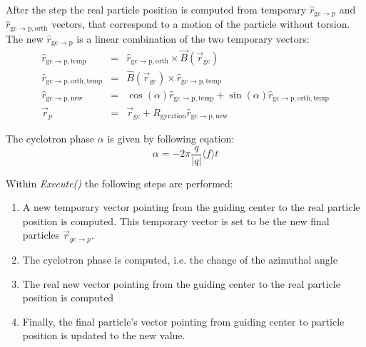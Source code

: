     After the step the real particle position is computed from temporary $\hat{r}_{\mathrm{gc\rightarrow p}}$ and $\hat{r}_{\mathrm{gc\rightarrow p, orth}}$ vectors, that correspond to a motion of the particle without torsion. The new $\hat{r}_{\mathrm{gc\rightarrow p}}$ is a linear combination of the two temporary vectors: 
    \begin{eqnarray}
        \hat{r}_{\mathrm{gc\rightarrow p, temp}} &=& \hat{r}_{\mathrm{gc\rightarrow p, orth}} \times \vec{B}(\vec{r}_{\mathrm{gc}}) \\
        \hat{r}_{\mathrm{gc\rightarrow p, orth, temp}}  &=& \hat{B}(\vec{r}_{\mathrm{gc}}) \times \hat{r}_{\mathrm{gc\rightarrow p, temp}} \\
        \hat{r}_{\mathrm{gc\rightarrow p, new}}  &=& \cos(\alpha) \hat{r}_{\mathrm{gc\rightarrow p, temp}} + \sin(\alpha) \hat{r}_{\mathrm{gc\rightarrow p,orth, temp}} \\
        \vec{r}_{p} &=& \vec{r}_{\mathrm{gc}} + R_{\mathrm{gyration}} \hat{r}_{\mathrm{gc\rightarrow p, new}}
    \end{eqnarray}
    
    The cyclotron phase $\alpha$ is given by following eqation:
    \begin{equation}
        \alpha = - 2 \pi \frac{q}{|q|} \langle f \rangle t
    \end{equation}
    
    Within \textit{Execute()} the following steps are performed:
    \begin{enumerate}
        \item A new temporary vector pointing from the guiding center to the real particle position is computed. This temporary vector is set to be the new final particles $\vec{r}_{gc\rightarrow p}$. 
        \item The cyclotron phase is computed, i.e. the change of the azimuthal angle
        \item The real new vector pointing from the guiding center to the real particle position is computed
	    \item Finally, the final particle's vector pointing from guiding center to particle position is updated to the new value.
    \end{enumerate}

